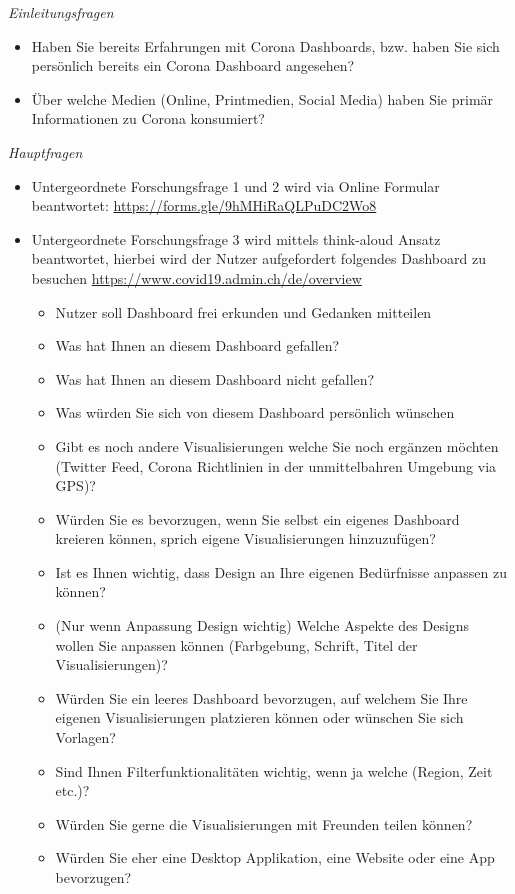 \documentclass[12pt, oneside]{article}
\begin{document}
\textit{Einleitungsfragen}
\begin{itemize}
    \item Haben Sie bereits Erfahrungen mit Corona Dashboards, bzw. haben Sie sich persönlich bereits ein Corona Dashboard angesehen?
    \item Über welche Medien (Online, Printmedien, Social Media) haben Sie primär Informationen zu Corona konsumiert?
\end{itemize}

\textit{Hauptfragen}
\begin{itemize}
    \item Untergeordnete Forschungsfrage 1 und 2 wird via Online Formular beantwortet: \url{https://forms.gle/9hMHiRaQLPuDC2Wo8}
    \item Untergeordnete Forschungsfrage 3 wird mittels think-aloud Ansatz beantwortet, hierbei wird der Nutzer aufgefordert folgendes Dashboard zu besuchen \url{https://www.covid19.admin.ch/de/overview}
    \begin{itemize}
        \item Nutzer soll Dashboard frei erkunden und Gedanken mitteilen
        \item Was hat Ihnen an diesem Dashboard gefallen?
        \item Was hat Ihnen an diesem Dashboard nicht gefallen?
        \item Was würden Sie sich von diesem Dashboard persönlich wünschen
        \item Gibt es noch andere Visualisierungen welche Sie noch ergänzen möchten (Twitter Feed, Corona Richtlinien in der unmittelbahren Umgebung via GPS)?
        \item Würden Sie es bevorzugen, wenn Sie selbst ein eigenes Dashboard kreieren können, sprich eigene Visualisierungen hinzuzufügen?
        \item Ist es Ihnen wichtig, dass Design an Ihre eigenen Bedürfnisse anpassen zu können?
        \item (Nur wenn Anpassung Design wichtig) Welche Aspekte des Designs wollen Sie anpassen können (Farbgebung, Schrift, Titel der Visualisierungen)?
        \item Würden Sie ein leeres Dashboard bevorzugen, auf welchem Sie Ihre eigenen Visualisierungen platzieren können oder wünschen Sie sich Vorlagen?
        \item Sind Ihnen Filterfunktionalitäten wichtig, wenn ja welche (Region, Zeit etc.)?
        \item Würden Sie gerne die Visualisierungen mit Freunden teilen können?
        \item Würden Sie eher eine Desktop Applikation, eine Website oder eine App bevorzugen?
    \end{itemize}
\end{itemize}
\end{document}
